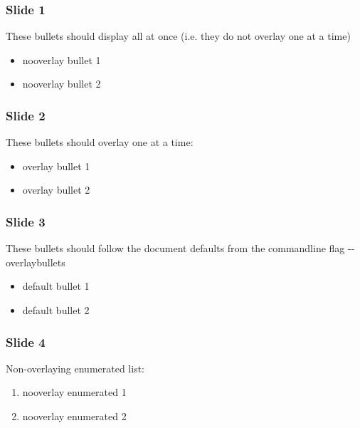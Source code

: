 \documentclass[t]{beamer}
\begin{document}
\begin{frame}[fragile]
\frametitle{Slide 1}


These bullets should display all at once (i.e. they do not overlay one
at a time)
\begin{itemize}

\item nooverlay bullet 1

\item nooverlay bullet 2
\end{itemize}

\end{frame}

\begin{frame}[fragile]
\frametitle{Slide 2}


These bullets should overlay one at a time:
\begin{itemize}[<+-| alert@+>]

\item overlay bullet 1

\item overlay bullet 2
\end{itemize}

\end{frame}

\begin{frame}[fragile]
\frametitle{Slide 3}


These bullets should follow the document defaults from the commandline
flag -{}-overlaybullets
\begin{itemize}[<+-| alert@+>]

\item default bullet 1

\item default bullet 2
\end{itemize}

\end{frame}

\begin{frame}[fragile]
\frametitle{Slide 4}


Non-overlaying enumerated list:
\begin{enumerate}

\item nooverlay enumerated 1

\item nooverlay enumerated 2
\end{enumerate}

\end{frame}
\end{document}
